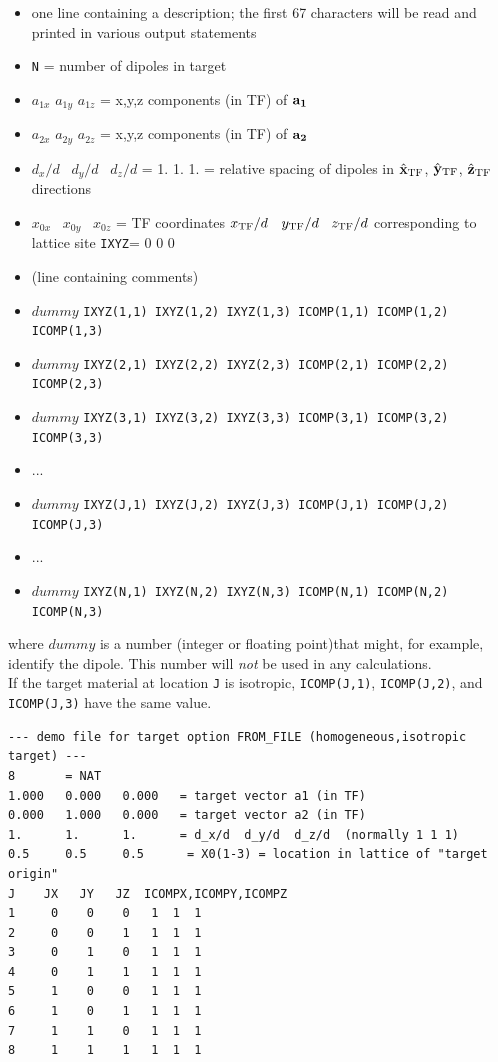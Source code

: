 	\begin{itemize}
	  \item one line containing a description; the first 67 characters will
	        be read and printed in various output statements
	  \item {\tt N} = number of dipoles in target
	  \item $a_{1x}$ $a_{1y}$ $a_{1z}$ = x,y,z components (in TF)
	    of $\bf{a}_1$
	\item $a_{2x}$ $a_{2y}$ $a_{2z}$ = x,y,z components (in TF)
	    of $\bf{a}_2$
        \item $d_x/d$ ~$d_y/d$ ~$d_z/d$ = 1. 1. 1. = relative spacing of
              dipoles in $\hat{\bf x}_{\rm TF}$, $\hat{\bf y}_{\rm TF}$, $\hat{\bf z}_{\rm TF}$ directions
	\item $x_{0x}$ ~$x_{0y}$ ~$x_{0z}$ = TF coordinates
              $x_{\rm TF}/d$ ~$y_{\rm TF}/d$ ~$z_{\rm TF}/d$ corresponding to
	      lattice site {\tt IXYZ}= 0 0 0
	\item (line containing comments)
	\item {\footnotesize
	      $dummy$ {\tt IXYZ(1,1) IXYZ(1,2) IXYZ(1,3) 
		ICOMP(1,1) ICOMP(1,2) ICOMP(1,3)}
              }
	\item {\footnotesize
	      $dummy$ {\tt IXYZ(2,1) IXYZ(2,2) IXYZ(2,3) 
		ICOMP(2,1) ICOMP(2,2) ICOMP(2,3)}
              }
	\item {\footnotesize
              $dummy$ {\tt IXYZ(3,1) IXYZ(3,2) IXYZ(3,3)
		ICOMP(3,1) ICOMP(3,2) ICOMP(3,3)}
              }
	\item ...
	\item {\footnotesize
              $dummy$ {\tt IXYZ(J,1) IXYZ(J,2) IXYZ(J,3)
		ICOMP(J,1) ICOMP(J,2) ICOMP(J,3)}
              }
	\item ...
	\item {\footnotesize
              $dummy$ {\tt IXYZ(N,1) IXYZ(N,2) IXYZ(N,3) 
		ICOMP(N,1) ICOMP(N,2) ICOMP(N,3)}
              }
	\end{itemize}
	where $dummy$ is a number (integer or floating point)that might,
        for example, identify the dipole.  This number will {\it not}
        be used in any calculations.\\
	If the target material at location {\tt J} is isotropic, 
	{\tt ICOMP(J,1)}, {\tt ICOMP(J,2)}, and
	{\tt ICOMP(J,3)} have the same value.

{\footnotesize
\begin{verbatim}
--- demo file for target option FROM_FILE (homogeneous,isotropic target) ---
8       = NAT
1.000   0.000   0.000   = target vector a1 (in TF)
0.000   1.000   0.000   = target vector a2 (in TF)
1.      1.      1.      = d_x/d  d_y/d  d_z/d  (normally 1 1 1)
0.5     0.5     0.5      = X0(1-3) = location in lattice of "target origin"
J    JX   JY   JZ  ICOMPX,ICOMPY,ICOMPZ
1     0    0    0   1  1  1
2     0    0    1   1  1  1
3     0    1    0   1  1  1
4     0    1    1   1  1  1
5     1    0    0   1  1  1
6     1    0    1   1  1  1
7     1    1    0   1  1  1
8     1    1    1   1  1  1
\end{verbatim}}

